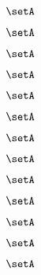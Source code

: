 \begin{forslides}
    \begin{equation}
        \label{eq:slides-processes-100}
        \setA
    \end{equation}

    \begin{equation}
        \label{eq:slides-processes-111}
        \setA
    \end{equation}

    \begin{equation}
        \label{eq:slides-processes-112}
        \setA
    \end{equation}

    \begin{equation}
        \label{eq:slides-processes-113}
        \setA
    \end{equation}

    \begin{equation}
        \label{eq:slides-processes-114}
        \setA
    \end{equation}

    \begin{equation}
        \label{eq:slides-processes-115}
        \setA
    \end{equation}

    \begin{equation}
        \label{eq:slides-processes-116}
        \setA
    \end{equation}

    \begin{equation}
        \label{eq:slides-processes-117}
        \setA
    \end{equation}

    \begin{equation}
        \label{eq:slides-processes-118}
        \setA
    \end{equation}

    \begin{equation}
        \label{eq:slides-processes-119}
        \setA
    \end{equation}
    
    \begin{equation}
        \label{eq:slides-processes-120}
        \setA
    \end{equation}

    \begin{equation}
        \label{eq:slides-processes-121}
        \setA
    \end{equation}

    \begin{equation}
        \label{eq:slides-processes-122}
        \setA
    \end{equation}


\end{forslides}
